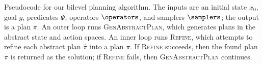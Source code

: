 \begin{algorithm}[t]
  \SetAlgoNoEnd
  \DontPrintSemicolon
\;
\caption{\small{Pseudocode for our bilevel planning algorithm. The inputs are an initial state $x_0$, goal $g$, predicates $\Psi$, operators $\operators$, and samplers $\samplers$; the output is a plan $\pi$. An outer loop runs \textsc{GenAbstractPlan}, which generates plans in the abstract state and action spaces. An inner loop runs \textsc{Refine}, which attempts to refine each abstract plan $\hat{\pi}$ into a plan $\pi$. If \textsc{Refine} succeeds, then the found plan $\pi$ is returned as the solution; if \textsc{Refine} fails, then \textsc{GenAbstractPlan} continues.}}
\label{alg:plan}
\end{algorithm}
